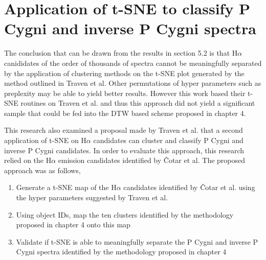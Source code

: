 \section{Application of t-SNE to classify P Cygni and inverse P Cygni spectra}

The conclusion that can be drawn from the results in section 5.2 is that H$\alpha$ canididates of the order of thousands of spectra cannot be meaningfully separated by the application of clustering methods on the t-SNE plot generated by the method outlined in Traven et al. Other permutations of hyper parameters such as preplexity may be able to yield better results. However this work based their t-SNE routines on Traven et al. and thus this approach did not yield a significant sample that could be fed into the DTW based scheme proposed in chapter 4. 

This research also examined a proposal made by Traven et al. that a second application of t-SNE on H$\alpha$ candidates can cluster and classify P Cygni and inverse P Cygni candidates. In order to evaluate this approach, this research relied on the H$\alpha$ emission candidates identified by Čotar et al. The proposed approach was as follows,

\begin{enumerate}
    \item Generate a t-SNE map of the H$\alpha$ candidates identified by Čotar et al. using the hyper parameters suggested by Traven et al.
    \item Using object IDs, map the ten clusters identified by the methodology proposed in chapter 4 onto this map
    \item Validate if t-SNE is able to meaningfully separate the P Cygni and inverse P Cygni spectra identified by the methodology proposed in chapter 4
\end{enumerate}

